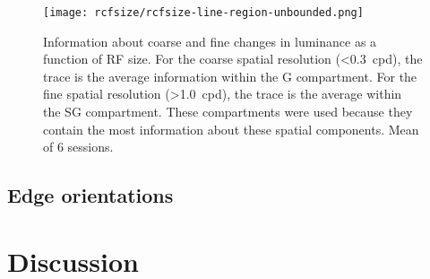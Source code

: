 

\begin{figure}[htb]
    \centering
    \texttt{[image: rcfsize/rcfsize-line-region-unbounded.png]}
    \caption{
Information about coarse and fine changes in luminance as a function of \ac{RF} size.
For the coarse spatial resolution (\SI{<0.3}{cpd}), the trace is the average information within the \ac{G} compartment.
For the fine spatial resolution (\SI{>1.0}{cpd}), the trace is the average within the \ac{SG} compartment.
These compartments were used because they contain the most information about these spatial components.
Mean of 6 sessions.
}
\label{fig:lam_rcfsize_trace}
\end{figure}

\subsection{Edge orientations}


\section{Discussion}

